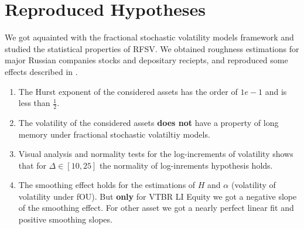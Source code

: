 \section{Reproduced Hypotheses}
    We got aquainted with the fractional stochastic volatility models framework and
    studied the statistical properties of RFSV. 
    We obtained roughness estimations for major Russian companies stocks and depositary 
    reciepts, and reproduced some effects described in \cite{GatheralRosenbaum2014}.

    \begin{enumerate}
        \item The Hurst exponent of the considered assets has the order of $1e-1$ and is less than $\frac{1}{2}$.
        \item The volatility of the considered assets \textbf{does not} have a property of long memory under fractional stochastic 
                volatiltiy models.
        \item Visual analysis and normality tests for the log-increments of volatility shows that for 
              $\Delta \in [10, 25]$ the normality of log-inrements hypothesis holds.
        \item The smoothing effect holds for the estimations of $H$ and $\alpha$ (volatility of volatility under fOU). 
              But \textbf{only} for  VTBR LI Equity we got a negative slope of the smoothing effect. For other
              asset we got a nearly perfect linear fit and positive smoothing slopes.
    \end{enumerate}